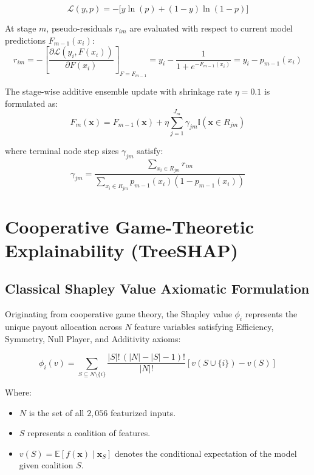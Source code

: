 \documentclass[11pt,a4paper]{article}
\begin{document}
\begin{equation}
\label{eq:cross_entropy}
\mathcal{L}(y, p) = - \Big[ y \ln(p) + (1 - y) \ln(1 - p) \Big]
\end{equation}

\noindent At stage $m$, pseudo-residuals $r_{im}$ are evaluated with respect to current model predictions $F_{m-1}(x_i)$:
\begin{equation}
\label{eq:residuals}
r_{im} = -\left[ \frac{\partial \mathcal{L}(y_i, F(x_i))}{\partial F(x_i)} \right]_{F=F_{m-1}} = y_i - \frac{1}{1 + e^{-F_{m-1}(x_i)}} = y_i - p_{m-1}(x_i)
\end{equation}

\noindent The stage-wise additive ensemble update with shrinkage rate $\eta = 0.1$ is formulated as:
\begin{equation}
\label{eq:gbdt_update}
F_m(\mathbf{x}) = F_{m-1}(\mathbf{x}) + \eta \sum_{j=1}^{J_m} \gamma_{jm} \mathbb{I}(\mathbf{x} \in R_{jm})
\end{equation}

\noindent where terminal node step sizes $\gamma_{jm}$ satisfy:
\begin{equation}
\gamma_{jm} = \frac{\sum_{x_i \in R_{jm}} r_{im}}{\sum_{x_i \in R_{jm}} p_{m-1}(x_i)(1 - p_{m-1}(x_i))}
\end{equation}

\section{Cooperative Game-Theoretic Explainability (TreeSHAP)}

\subsection{Classical Shapley Value Axiomatic Formulation}
Originating from cooperative game theory, the Shapley value $\phi_i$ represents the unique payout allocation across $N$ feature variables satisfying Efficiency, Symmetry, Null Player, and Additivity axioms:

\begin{equation}
\label{eq:shapley}
\phi_i(v) = \sum_{S \subseteq N \setminus \{i\}} \frac{|S|! \, (|N| - |S| - 1)!}{|N|!} \left[ v(S \cup \{i\}) - v(S) \right]
\end{equation}

\noindent Where:
\begin{itemize}
    \item $N$ is the set of all $2{,}056$ featurized inputs.
    \item $S$ represents a coalition of features.
    \item $v(S) = \mathbb{E}[f(\mathbf{x}) \mid \mathbf{x}_S]$ denotes the conditional expectation of the model given coalition $S$.
\end{itemize}
\end{document}
